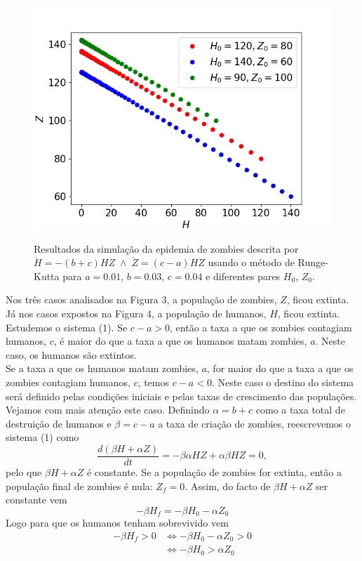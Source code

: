 \documentclass[aps,pre,twocolumn,showpacs,amsmath,amssymb]{revtex4-1}
\begin{document}
\begin{figure}[hbt!]
   \begin{center}
    \includegraphics[width=\columnwidth]{epidemiazombierk.png} \\
\caption{Resultados da simulação da epidemia de zombies descrita por     $\dot H=-(b+c)HZ\; \wedge \;\dot Z=(c-a)HZ$ usando o método de Runge-Kutta para $a=0.01$, $b=0.03$, $c=0.04$ e diferentes pares $H_0$, $Z_0$.}
  \label{epidemiark}
   \end{center}
  \end{figure}
Nos três casos analisados na Figura 3, a população de zombies, $Z$, ficou extinta. Já nos casos expostos na Figura 4, a população de humanos, $H$, ficou extinta.\\
Estudemos o sistema (1). Se $c-a>0$, então a taxa a que os zombies contagiam humanos, $c$, é maior do que a taxa a que os humanos matam zombies, $a$. Neste caso, os humanos são extintos.\\ Se a taxa a que os humanos matam zombies, $a$, for maior do que a taxa a que os zombies contagiam humanos, $c$, temos $c-a<0$. Neste caso o destino do sistema será definido pelas condições iniciais e pelas taxas de crescimento das populações. Vejamos com mais atenção este caso.
Definindo $\alpha =b+c$ como a taxa total de destruição de humanos e $\beta = c-a$ a taxa de criação de zombies, reescrevemos o sistema (1) como
\begin{equation}
    \frac{d(\beta H+\alpha Z)}{dt}=-\beta \alpha HZ + \alpha \beta HZ =0,
\end{equation}
pelo que $\beta H + \alpha Z$ é constante. Se a população de zombies for extinta, então a população final de zombies é nula: $Z_f=0$. Assim, do facto de $\beta H + \alpha Z$ ser constante vem
\begin{equation}
    -\beta H_f= -\beta H_0 - \alpha Z_0
\end{equation}
Logo para que os humanos tenham sobrevivido vem
\begin{equation}
\begin{split}
   -\beta H_f>0 &\iff -\beta H_0 - \alpha Z_0 >0 \\
   &\iff -\beta H_0 > \alpha Z_0
\end{split}
\end{equation}
\end{document}
